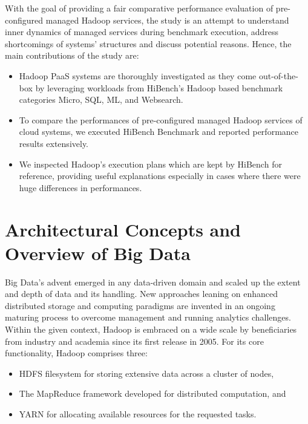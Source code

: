 \documentclass[review]{elsarticle}
\begin{document}
With the goal of providing a fair comparative performance evaluation of pre-configured managed Hadoop services, the study is an attempt to understand inner dynamics of managed services during benchmark execution, address shortcomings of systems' structures and discuss potential reasons. Hence, the main contributions of the study are:

\begin{itemize}
	\item Hadoop PaaS systems are thoroughly investigated as they come out-of-the-box by leveraging workloads from HiBench's Hadoop based benchmark categories Micro, SQL, ML, and Websearch.
	\item To compare the performances of pre-configured managed Hadoop services of cloud systems, we executed HiBench Benchmark and reported performance results extensively.
	\item We inspected Hadoop's execution plans which are kept by HiBench for reference, providing useful explanations especially in cases where there were huge differences in performances.
\end{itemize}

\section{Architectural Concepts and Overview of Big Data} 	\label{sec:Background}

Big Data's advent emerged in any data-driven domain and scaled up the extent and depth of data and its handling. New approaches leaning on enhanced distributed storage and computing paradigms are invented in an ongoing maturing process to overcome management and running analytics challenges. Within the given context, Hadoop is embraced on a wide scale by beneficiaries from industry and academia since its first release in 2005.
For its core functionality, Hadoop comprises three:

\begin{itemize}
	\item HDFS filesystem for storing extensive data across a cluster of nodes,
	\item The MapReduce framework developed for distributed computation, and 
	\item YARN for allocating available resources for the requested tasks.
\end{itemize}
\end{document}
